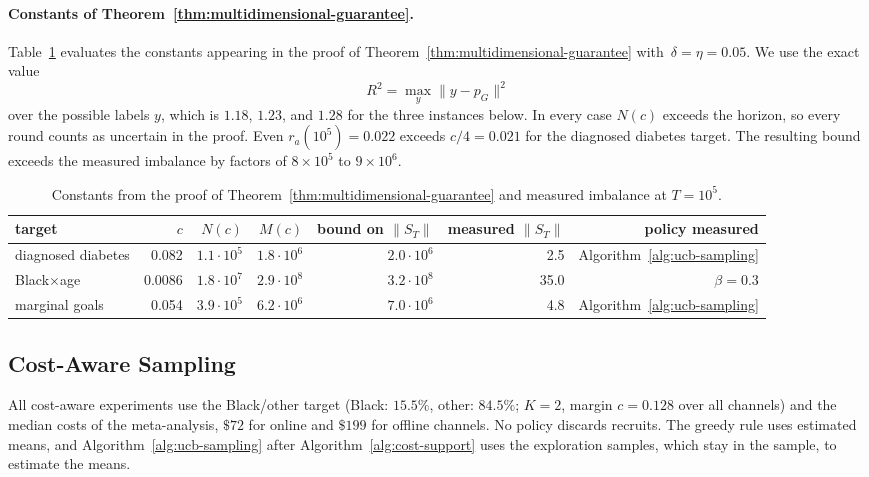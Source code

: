 \documentclass[twoside]{article}
\begin{document}
\paragraph{Constants of Theorem~\ref{thm:multidimensional-guarantee}.}
Table~\ref{tab:constants} evaluates the constants appearing in the proof of
Theorem~\ref{thm:multidimensional-guarantee} with~\(\delta=\eta=0.05\).  We use the exact value
\[
R^2=\max_y \|y-p_G\|^2
\]
over the possible labels \(y\), which is \(1.18\), \(1.23\), and \(1.28\)
for the three instances below.  In every case \(N(c)\) exceeds the horizon,
so every round counts as uncertain in the proof.  Even
\(r_a(10^5)=0.022\) exceeds \(c/4=0.021\) for the diagnosed diabetes target.
The resulting bound exceeds the measured imbalance by factors of
\(8\times10^5\) to \(9\times10^6\).

\begin{table}[!ht]
\caption{Constants from the proof of
Theorem~\ref{thm:multidimensional-guarantee} and measured imbalance at
\(T=10^5\).}
\label{tab:constants}
\centering\small
\begin{tabular}{lrrrrrr}
\hline
target & \(c\) & \(N(c)\) & \(M(c)\) & bound on \(\|S_T\|\) & measured \(\|S_T\|\) & policy measured\\
\hline
diagnosed diabetes & 0.082 & \(1.1\cdot10^5\) & \(1.8\cdot10^6\) & \(2.0\cdot10^6\) & 2.5 & Algorithm~\ref{alg:ucb-sampling}\\
Black\(\times\)age & 0.0086 & \(1.8\cdot10^7\) & \(2.9\cdot10^8\) & \(3.2\cdot10^8\) & 35.0 & \(\beta=0.3\)\\
marginal goals & 0.054 & \(3.9\cdot10^5\) & \(6.2\cdot10^6\) & \(7.0\cdot10^6\) & 4.8 & Algorithm~\ref{alg:ucb-sampling}\\
\hline
\end{tabular}
\end{table}

\FloatBarrier
\subsection{Cost-Aware Sampling}
\label{app:exp-cost}

All cost-aware experiments use the Black/other target (Black: \(15.5\%\),
other: \(84.5\%\); \(K=2\), margin \(c=0.128\) over all channels) and the
median costs of the meta-analysis, \(\$72\) for online and \(\$199\) for
offline channels. No policy discards recruits. The greedy rule uses
estimated means, and Algorithm~\ref{alg:ucb-sampling} after
Algorithm~\ref{alg:cost-support} uses the exploration samples, which stay in
the sample, to estimate the means.
\end{document}

